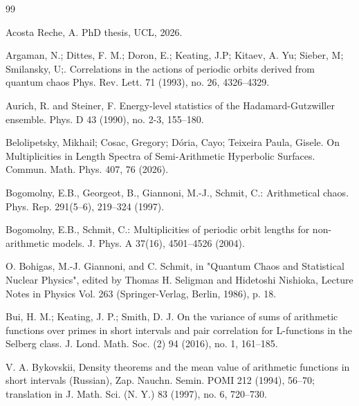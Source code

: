 \documentclass[12pt]{amsart}
\begin{document}
\begin{thebibliography}{99}

Acosta Reche, A. PhD thesis, UCL, 2026.


Argaman, N.; Dittes, F. M.; Doron, E.;  Keating, J.P; Kitaev, A. Yu; Sieber, M; Smilansky, U;.
 Correlations in the actions of periodic orbits derived from quantum chaos
Phys. Rev. Lett. 71 (1993), no. 26, 4326--4329.

Aurich, R.  and Steiner, F.  
Energy-level statistics of the Hadamard-Gutzwiller ensemble.
Phys. D 43 (1990), no. 2-3, 155--180.

Belolipetsky, Mikhail; Cosac, Gregory; D\'oria, Cayo; Teixeira Paula, Gisele. 
On Multiplicities in Length Spectra of Semi-Arithmetic Hyperbolic Surfaces. Commun. Math. Phys. 407, 76 (2026).

Bogomolny, E.B., Georgeot, B., Giannoni, M.-J., Schmit, C.: Arithmetical chaos. Phys. Rep. 291(5–6), 219--324 (1997).

Bogomolny, E.B., Schmit, C.: Multiplicities of periodic orbit lengths for non-arithmetic models. J. Phys. A 37(16), 4501--4526 (2004). 

  O. Bohigas, M.-J. Giannoni, and C. Schmit, in "Quantum Chaos and Statistical Nuclear Physics", edited by Thomas H. Seligman and Hidetoshi Nishioka, Lecture Notes in Physics Vol. 263 (Springer-Verlag, Berlin, 1986), p. 18.



Bui, H. M.; Keating, J. P.;  Smith, D. J. 
On the variance of sums of arithmetic functions over primes in short intervals and pair correlation for L-functions in the Selberg class. 
J. Lond. Math. Soc. (2) 94 (2016), no. 1, 161--185.

 
V. A. Bykovskii, Density theorems and the mean value of arithmetic functions in short intervals (Russian), Zap. Nauchn. Semin. POMI 212 (1994), 56--70; translation in J. Math. Sci. (N. Y.) 83 (1997), no. 6, 720--730.


\end{thebibliography}
\end{document}
